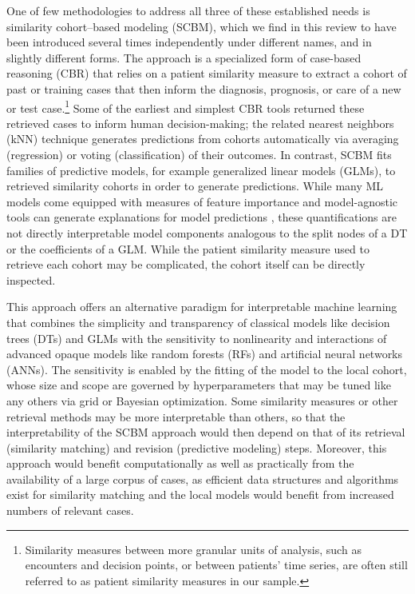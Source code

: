 \documentclass[sn-mathphys,Numbered,pdflatex]{sn-jnl}
\theoremstyle{remark}
\theoremstyle{definition}
\newcommand{\hl}[1]{#1}
\begin{document}
One of few methodologies to address all three of these established needs
is \hl{similarity cohort--based modeling (SCBM)}, which
\hl{we find in this review} to have been introduced several times
independently under different names, and in slightly different forms.
The approach is a specialized form of case-based reasoning (CBR) that
relies on a \hl{patient similarity measure }\citep{Brown2016} to extract
a cohort of past or training cases that then inform the diagnosis,
prognosis, or care of a new or test case.\footnote{Similarity measures
  between more granular units of analysis, such as encounters and
  decision points\hl{, or between patients' time series}, are often
  still referred to as patient similarity measures\hl{ in our sample}.}
\hl{Some of the earliest and simplest CBR tools returned} these
retrieved cases \hl{ to inform human decision-making}\citep{Aamodt1994};
the related nearest neighbors (\hl{kNN}) technique generates predictions
from cohorts automatically via averaging (regression) or voting
(classification) of their outcomes. In contrast, \hl{SCBM} fits families
of predictive models, for example generalized linear models (GLMs), to
retrieved similarity cohorts in order to generate predictions.
\hl{While many ML models come equipped with measures of feature importance and model-agnostic tools can generate explanations for model predictions }\citep{Molnar2023}\hl{, these quantifications are not directly interpretable model components analogous to the split nodes of a DT or the coefficients of a GLM.
While the patient similarity measure used to retrieve each cohort may be complicated, the cohort itself can be directly inspected.}

\hl{This approach offers an alternative paradigm for interpretable machine learning that combines the simplicity and transparency of classical models like decision trees (DTs) and GLMs with the sensitivity to nonlinearity and interactions of advanced opaque models like random forests (RFs) and artificial neural networks (ANNs). The sensitivity is enabled by the fitting of the model to the local cohort, whose size and scope are governed by hyperparameters that may be tuned like any others via grid or Bayesian optimization. Some similarity measures or other retrieval methods may be more interpretable than others, so that the interpretability of the SCBM approach would then depend on that of its retrieval (similarity matching) and revision (predictive modeling) steps. Moreover, this approach would benefit computationally as well as practically from the availability of a large corpus of cases, as efficient data structures and algorithms exist for similarity matching }\citep{Halder2024}\hl{ and the local models would benefit from increased numbers of relevant cases.}
\end{document}
